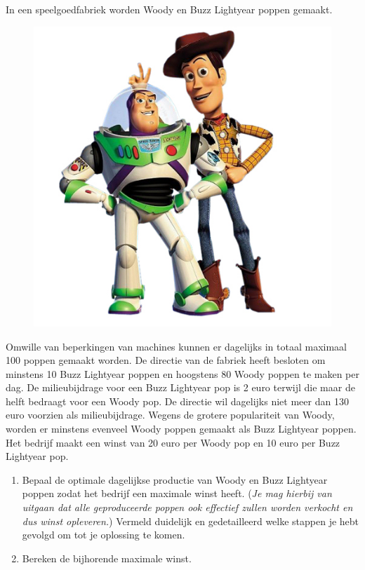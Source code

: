 \begin{oef}
In een speelgoedfabriek worden Woody
en Buzz Lightyear poppen gemaakt. 
\begin{figure}[ht]
  \centering
    \includegraphics[scale=0.5]{oefeningen/FigurenLP/Buzz-Woody.jpg}
\end{figure}
Omwille van beperkingen van machines
kunnen er dagelijks in totaal maximaal 100 poppen gemaakt worden. De
directie van de fabriek heeft besloten om minstens 10 Buzz Lightyear
poppen en hoogstens 80 Woody poppen te maken per dag. 
De milieubijdrage
voor een Buzz Lightyear pop is 2 euro terwijl die maar de helft
bedraagt voor een Woody pop. De directie wil dagelijks niet meer dan 130
euro voorzien als milieubijdrage. Wegens de grotere populariteit van
Woody, worden er minstens evenveel Woody poppen gemaakt als Buzz
Lightyear poppen. Het bedrijf maakt een winst van 20 euro per Woody pop
en 10 euro per Buzz Lightyear pop. \begin{enumerate}
	\item Bepaal de optimale dagelijkse productie van Woody en Buzz
Lightyear poppen zodat het bedrijf een maximale winst heeft.
(\textit{Je mag hierbij van uitgaan dat alle geproduceerde poppen ook
effectief zullen worden verkocht en dus winst opleveren.}) Vermeld
duidelijk en gedetailleerd welke stappen je hebt gevolgd om tot je
oplossing te komen.
	\item  Bereken de bijhorende maximale winst.
\end{enumerate}
\end{oef}
  
